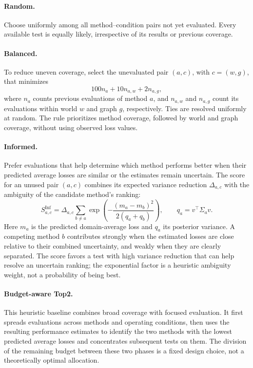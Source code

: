 \documentclass[10pt,a4paper]{article}
\begin{document}
\paragraph{Random.} Choose uniformly among all method--condition pairs not yet evaluated. Every available test is equally likely, irrespective of its results or previous coverage.
\paragraph{Balanced.}
To reduce uneven coverage, select the unevaluated pair
$(a,c)$, with $c=(w,g)$, that minimizes
\[
    100n_a+10n_{a,w}+2n_{a,g},
\]
where $n_a$ counts previous evaluations of method $a$,
and $n_{a,w}$ and $n_{a,g}$ count its evaluations within
world $w$ and graph $g$, respectively.
Ties are resolved uniformly at random.
The rule prioritizes method coverage, followed by world
and graph coverage, without using observed loss values.
\paragraph{Informed.} Prefer evaluations that help determine which method performs better when their predicted average losses are similar or the estimates remain uncertain. The score for an unused pair $(a,c)$ combines its expected variance reduction $\Delta_{a,c}$ with the ambiguity of the candidate method's ranking:
\begin{equation}
S_{a,c}^{\mathrm{Inf}}=
\Delta_{a,c}
\sum_{b\ne a}\exp\!\left(
-\frac{(m_a-m_b)^2}{2(q_a+q_b)}
\right),
\qquad q_a=v^\top\Sigma_a v.
\label{eq:informed}
\end{equation}
Here $m_a$ is the predicted domain-average loss and $q_a$ its posterior variance. A competing method $b$ contributes strongly when the estimated losses are close relative to their combined uncertainty, and weakly when they are clearly separated. The score favors a test with high variance reduction that can help resolve an uncertain ranking; the exponential factor is a heuristic ambiguity weight, not a probability of being best.
\paragraph{Budget-aware Top2.}
This heuristic baseline combines broad coverage with focused evaluation. It first spreads evaluations across methods and operating conditions, then uses the resulting performance estimates to identify the two methods with the lowest predicted average losses and concentrates subsequent tests on them. The division of the remaining budget between these two phases is a fixed design choice, not a theoretically optimal allocation.
\end{document}

